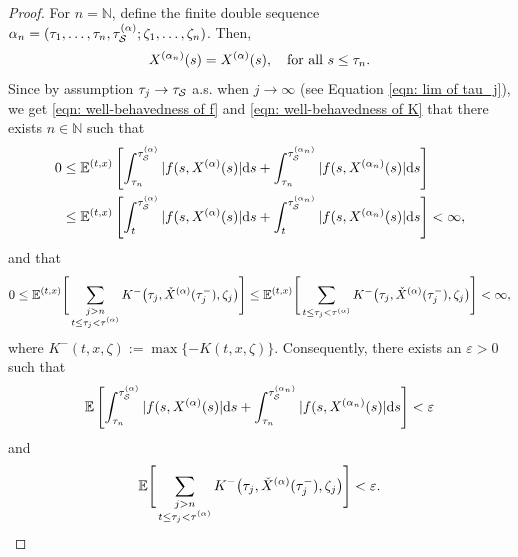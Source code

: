 \begin{proof}
    For $n=\mathbb N$, define the finite double sequence $\alpha_n = (\tau_1, \ldots, \tau_n, \tau_{\mathcal{S}}^{(\alpha)}; \zeta_1, \ldots, \zeta_n)$. Then,
    \begin{equation}
        X^{(\alpha_n)}(s) = X^{(\alpha)}(s), \quad \text{for all } s \leq \tau_n.
        \label{eqn: (10.1.6) in ØS}
    \end{equation}
    Since by assumption $\tau_j \rightarrow \tau_{\mathcal{S}}$ a.s. when $j \rightarrow \infty$ (see Equation \eqref{eqn: lim of tau_j}), we get \eqref{eqn: well-behavedness of f} and \eqref{eqn: well-behavedness of K} that there exists $n \in \mathbb N$ such that 
    \begin{align*}
        0 & \leq \mathbb{E}^{(t,x)} \left[ \int_{\tau_n}^{\tau_{\mathcal{S}}^{(\alpha)}} |f(s,X^{(\alpha)}(s)| \mathrm{d} s + \int_{\tau_n}^{\tau_{\mathcal{S}}^{(\alpha_n)}} |f(s,X^{(\alpha_n)}(s)| \mathrm{d} s \right] \\ 
        & \leq  \mathbb{E}^{(t,x)} \left[ \int_{t}^{\tau_{\mathcal{S}}^{(\alpha)}} |f(s,X^{(\alpha)}(s)| \mathrm{d} s + \int_{t}^{\tau_{\mathcal{S}}^{(\alpha_n)}} |f(s,X^{(\alpha_n)}(s)| \mathrm{d} s \right] < \infty,
    \end{align*}
    and that 
    \begin{equation*}
        0 \leq \mathbb{E}^{(t,x)} \Bigg[ \sum_{\substack{j > n \\ t \leq \tau_j < \tau^{(\alpha)}}} K^-\big( \tau_j, \check{X}^{(\alpha)}(\tau_j^-),\zeta_j \big) \Bigg] \leq \mathbb{E}^{(t,x)} \Bigg[ \sum_{t \leq \tau_j < \tau^{(\alpha)}} K^-\big(\tau_j, \check{X}^{(\alpha)}(\tau_j^-),\zeta_j \big) \Bigg] < \infty,
    \end{equation*}
    where $K^-(t,x, \zeta) := \max \{-K(t,x,\zeta)\}$. Consequently, there exists an $\varepsilon > 0$ such that 
    \begin{equation}
        \mathbb{E} \left[ \int_{\tau_n}^{\tau_{\mathcal{S}}^{(\alpha)}} |f(s,X^{(\alpha)}(s)| \mathrm{d} s + \int_{\tau_n}^{\tau_{\mathcal{S}}^{(\alpha_n)}} |f(s,X^{(\alpha_n)}(s)| \mathrm{d} s \right] < \varepsilon
        \label{eqn: (10.1.7) in ØS}
    \end{equation}
    and
    \begin{equation}
        \mathbb{E} \Bigg[ \sum_{\substack{j > n \\ t \leq \tau_j < \tau^{(\alpha)}}} K^-\big(\tau_j, \check{X}^{(\alpha)}(\tau_j^-),\zeta_j \big) \Bigg] < \varepsilon.
        \label{eqn: (10.1.8) in ØS}
    \end{equation}
    

\end{proof}
